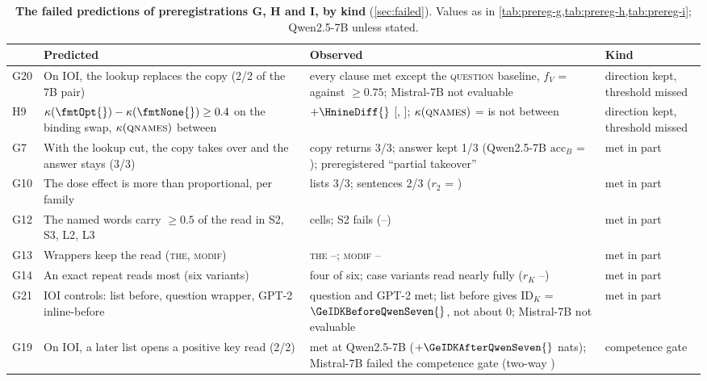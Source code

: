 \begin{table}[p]
\centering
\footnotesize
\caption{\textbf{The \GHIcountFailed{} failed predictions of preregistrations G, H and I, by kind} (\cref{sec:failed}). Values as in \cref{tab:prereg-g,tab:prereg-h,tab:prereg-i}; Qwen2.5-7B unless stated.}
\label{tab:failures}
\begin{tabular}{@{}l p{} p{} p{}@{}}
\toprule
& Predicted & Observed & Kind \\
\midrule
G20 & On IOI, the lookup replaces the copy (2/2 of the 7B pair) & every clause met except the \textsc{question} baseline, $f_V$ = \GeFVQuestionQwenSeven{} against $\geq 0.75$; Mistral-7B not evaluable & direction kept, threshold missed \\
H9 & $\kappa(\text{\fmtOpt{}}) - \kappa(\text{\fmtNone{}}) \geq 0.4$ on the binding swap, $\kappa(\textsc{qnames})$ between & $+\HnineDiff{}$ [\HnineDiffLo{}, \HnineDiffHi{}]; $\kappa(\textsc{qnames})$ = \PkKappaBindQnames{} is not between & direction kept, threshold missed \\
\midrule
G7 & With the lookup cut, the copy takes over and the answer stays (3/3) & copy returns 3/3; answer kept 1/3 (Qwen2.5-7B $\mathrm{acc}_B$ = \GsevenAccBAfterQwenSeven{}); preregistered ``partial takeover'' & met in part \\
G10 & The dose effect is more than proportional, per family & lists 3/3; sentences 2/3 ($r_2$ = \GtenSRtwoQwenSeven{}) & met in part \\
G12 & The named words carry $\geq 0.5$ of the read in S2, S3, L2, L3 & \GtwelveCells{} cells; S2 fails (\GtwelveStwoQwenFourteen{}--\GtwelveStwoQwenSeven{}) & met in part \\
G13 & Wrappers keep the read (\textsc{the}, \textsc{modif}) & \textsc{the} \GthirteenTheMin{}--\GthirteenTheMax{}; \textsc{modif} \GthirteenModifMin{}--\GthirteenModifMax{} & met in part \\
G14 & An exact repeat reads most (six variants) & four of six; case variants read nearly fully ($r_K$ \GfourteenCaseMin{}--\GfourteenCaseMax{}) & met in part \\
G21 & IOI controls: list before, question wrapper, GPT-2 inline-before & question and GPT-2 met; list before gives $\mathrm{ID}_K$ = $\GeIDKBeforeQwenSeven{}$, not about 0; Mistral-7B not evaluable & met in part \\
\midrule
G19 & On IOI, a later list opens a positive key read (2/2) & met at Qwen2.5-7B ($+\GeIDKAfterQwenSeven{}$ nats); Mistral-7B failed the competence gate (two-way \GeTwowayAfterMistralSeven{}) & competence gate \\

\end{tabular}
\end{table}
